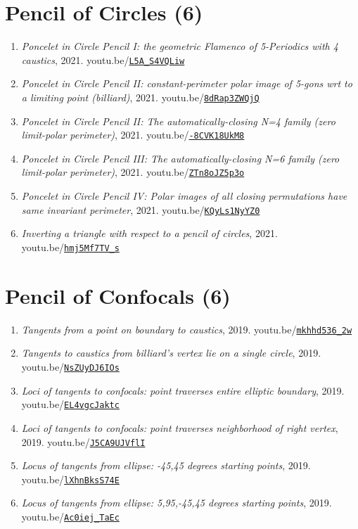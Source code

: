\documentclass[12pt]{article}
\begin{document}
\section{Pencil of Circles (6)}

\begin{enumerate}[resume]
\item \textit{Poncelet in Circle Pencil I: the geometric Flamenco of 5-Periodics with 4 caustics}, 2021. youtu.be/\href{https://youtu.be/L5A_S4VQLiw}{\nolinkurl{L5A\_S4VQLiw}}
\item \textit{Poncelet in Circle Pencil II: constant-perimeter polar image of 5-gons wrt to a limiting point (billiard)}, 2021. youtu.be/\href{https://youtu.be/8dRap3ZWQjQ}{\nolinkurl{8dRap3ZWQjQ}}
\item \textit{Poncelet in Circle Pencil II: The automatically-closing N=4 family (zero limit-polar perimeter)}, 2021. youtu.be/\href{https://youtu.be/-8CVK18UkM8}{\nolinkurl{-8CVK18UkM8}}
\item \textit{Poncelet in Circle Pencil III: The automatically-closing N=6 family (zero limit-polar perimeter)}, 2021. youtu.be/\href{https://youtu.be/ZTn8oJZ5p3o}{\nolinkurl{ZTn8oJZ5p3o}}
\item \textit{Poncelet in Circle Pencil IV: Polar images of all closing permutations have same invariant perimeter}, 2021. youtu.be/\href{https://youtu.be/KQyLs1NyYZ0}{\nolinkurl{KQyLs1NyYZ0}}
\item \textit{Inverting a triangle with respect to a pencil of circles}, 2021. youtu.be/\href{https://youtu.be/hmj5Mf7TV_s}{\nolinkurl{hmj5Mf7TV\_s}}
\end{enumerate}

\section{Pencil of Confocals (6)}

\begin{enumerate}[resume]
\item \textit{Tangents from a point on boundary to caustics}, 2019. youtu.be/\href{https://youtu.be/mkhhd536_2w}{\nolinkurl{mkhhd536\_2w}}
\item \textit{Tangents to caustics from billiard's vertex lie on a single circle}, 2019. youtu.be/\href{https://youtu.be/NsZUyDJ6IOs}{\nolinkurl{NsZUyDJ6IOs}}
\item \textit{Loci of tangents to confocals: point traverses entire elliptic boundary}, 2019. youtu.be/\href{https://youtu.be/EL4vgcJaktc}{\nolinkurl{EL4vgcJaktc}}
\item \textit{Loci of tangents to confocals: point traverses neighborhood of right vertex}, 2019. youtu.be/\href{https://youtu.be/J5CA9UJVflI}{\nolinkurl{J5CA9UJVflI}}
\item \textit{Locus of tangents from ellipse: -45,45 degrees starting points}, 2019. youtu.be/\href{https://youtu.be/lXhnBksS74E}{\nolinkurl{lXhnBksS74E}}
\item \textit{Locus of tangents from ellipse: 5,95,-45,45 degrees starting points}, 2019. youtu.be/\href{https://youtu.be/Ac0iej_TaEc}{\nolinkurl{Ac0iej\_TaEc}}
\end{enumerate}
\end{document}
